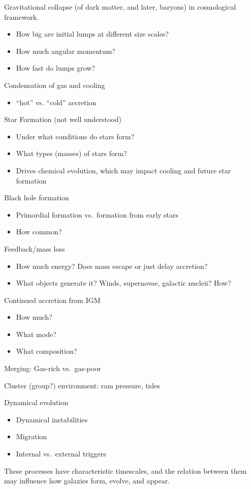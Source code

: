 \documentclass[12pt]{article}
\begin{document}
  \begin{itemize*}
    \item Gravitational collapse (of dark matter, and later, baryons)
    in cosmological framework.
    \begin{itemize}
      \item How big are initial lumps at different size scales?
      \item How much angular momentum?
      \item How fast do lumps grow?
    \end{itemize}
    \item Condensation of gas and cooling
    \begin{itemize}
      \item ``hot'' vs. ``cold'' accretion
    \end{itemize}
    \item Star Formation (not well understood)
    \begin{itemize}
      \item Under what conditions do stars form?
      \item What types (masses) of stars form?
      \item Drives chemical evolution, which may impact
      cooling and future star formation
    \end{itemize}
    \item Black hole formation
    \begin{itemize}
      \item Primordial formation vs.\ formation from early stars
      \item How common?
    \end{itemize}
    \item Feedback/mass loss
    \begin{itemize}
      \item How much energy? Does mass escape or just delay accretion?
      \item What objects generate it? Winds, supernovae, galactic
      nucleii? How?
    \end{itemize}
    \item Continued accretion from IGM
    \begin{itemize}
      \item How much?
      \item What mode?
      \item What composition?
    \end{itemize}
    \item Merging: Gas-rich vs.\ gas-poor
    \item Cluster (group?) environment: ram pressure, tides
    \item Dynamical evolution
    \begin{itemize}
      \item Dynamical instabilities
      \item Migration
      \item Internal vs.\ external triggers
    \end{itemize}
  \end{itemize*}
These processes have characteristic timescales, and the relation between
them may influence how galaxies form, evolve, and appear.
\end{document}
